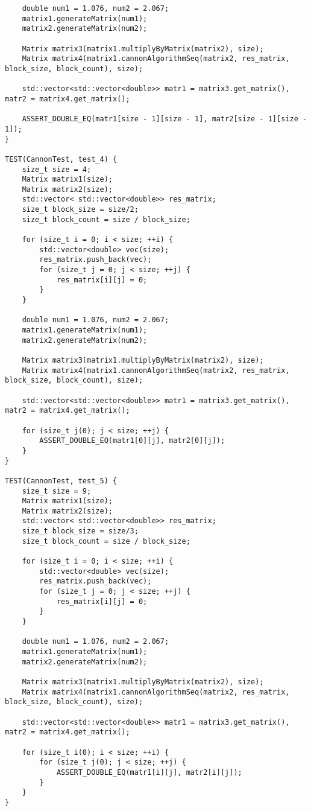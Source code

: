 \documentclass{report}
\begin{document}
\begin{lstlisting}
    double num1 = 1.076, num2 = 2.067;
    matrix1.generateMatrix(num1);
    matrix2.generateMatrix(num2);

    Matrix matrix3(matrix1.multiplyByMatrix(matrix2), size);
    Matrix matrix4(matrix1.cannonAlgorithmSeq(matrix2, res_matrix, block_size, block_count), size);

    std::vector<std::vector<double>> matr1 = matrix3.get_matrix(), matr2 = matrix4.get_matrix();

    ASSERT_DOUBLE_EQ(matr1[size - 1][size - 1], matr2[size - 1][size - 1]);
}

TEST(CannonTest, test_4) {
    size_t size = 4;
    Matrix matrix1(size);
    Matrix matrix2(size);
    std::vector< std::vector<double>> res_matrix;
    size_t block_size = size/2;
    size_t block_count = size / block_size;

    for (size_t i = 0; i < size; ++i) {
        std::vector<double> vec(size);
        res_matrix.push_back(vec);
        for (size_t j = 0; j < size; ++j) {
            res_matrix[i][j] = 0;
        }
    }

    double num1 = 1.076, num2 = 2.067;
    matrix1.generateMatrix(num1);
    matrix2.generateMatrix(num2);

    Matrix matrix3(matrix1.multiplyByMatrix(matrix2), size);
    Matrix matrix4(matrix1.cannonAlgorithmSeq(matrix2, res_matrix, block_size, block_count), size);

    std::vector<std::vector<double>> matr1 = matrix3.get_matrix(), matr2 = matrix4.get_matrix();

    for (size_t j(0); j < size; ++j) {
        ASSERT_DOUBLE_EQ(matr1[0][j], matr2[0][j]);
    }
}

TEST(CannonTest, test_5) {
    size_t size = 9;
    Matrix matrix1(size);
    Matrix matrix2(size);
    std::vector< std::vector<double>> res_matrix;
    size_t block_size = size/3;
    size_t block_count = size / block_size;

    for (size_t i = 0; i < size; ++i) {
        std::vector<double> vec(size);
        res_matrix.push_back(vec);
        for (size_t j = 0; j < size; ++j) {
            res_matrix[i][j] = 0;
        }
    }

    double num1 = 1.076, num2 = 2.067;
    matrix1.generateMatrix(num1);
    matrix2.generateMatrix(num2);

    Matrix matrix3(matrix1.multiplyByMatrix(matrix2), size);
    Matrix matrix4(matrix1.cannonAlgorithmSeq(matrix2, res_matrix, block_size, block_count), size);

    std::vector<std::vector<double>> matr1 = matrix3.get_matrix(), matr2 = matrix4.get_matrix();

    for (size_t i(0); i < size; ++i) {
        for (size_t j(0); j < size; ++j) {
            ASSERT_DOUBLE_EQ(matr1[i][j], matr2[i][j]);
        }
    }
}
\end{lstlisting}
\end{document}
